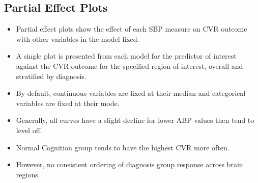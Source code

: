 \documentclass[10pt]{article}\usepackage[]{graphicx}\usepackage[]{color}
\begin{document}
\clearpage
\subsection{Partial Effect Plots}

\begin{itemize}
  \item Partial effect plots show the effect of each SBP measure on CVR outcome with other variables in the model fixed. 
  \item A single plot is presented from each model for the predictor of interest against the CVR outcome for the specified region of interest, overall and stratified by diagnosis.
  \item By default, continuous variables are fixed at their median and categorical variables are fixed at their mode.
  \item Generally, all curves have a slight decline for lower ABP values then tend to level off.
  \item  Normal Cognition group tends to have the highest CVR more often.
  \item However, no consistent ordering of diagnosis group response across brain regions.
\end{itemize}
\end{document}
